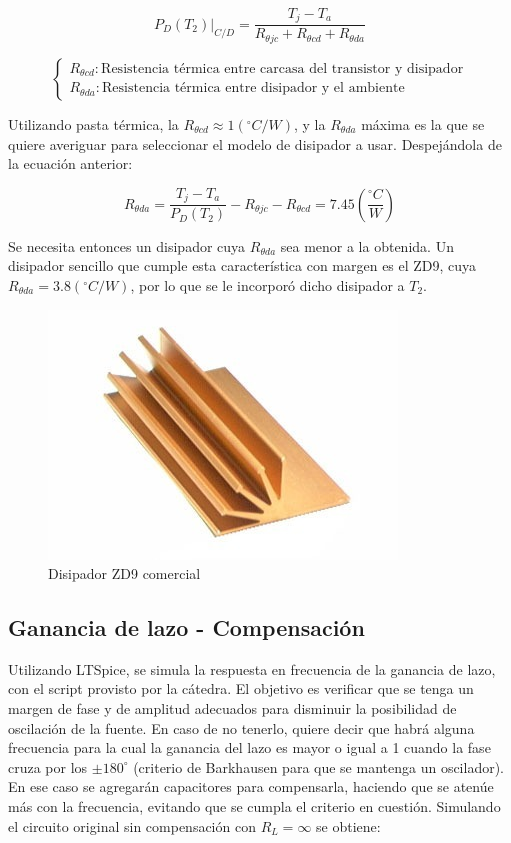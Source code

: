 \[
P_D(T_2) \biggr|_{C/D} = \frac{T_j - T_a}{R_{\theta jc} + R_{\theta cd} + R_{\theta da}}
\]
 
\[
\left\lbrace
\begin{array}{l}
R_{\theta cd}: \textrm{Resistencia t\'ermica entre carcasa del transistor y disipador} \\
R_{\theta da}: \textrm{Resistencia t\'ermica entre disipador y el ambiente}
\end{array}
\right.
\] 

Utilizando pasta t\'ermica, la $R_{\theta cd} \approx 1(^{\circ}C/W)$, y la $R_{\theta da}$ m\'axima es la que se quiere averiguar para seleccionar el modelo de disipador a usar. Despej\'andola de la ecuaci\'on anterior:

\[
R_{\theta da} = \frac{T_j - T_a}{P_D(T_2)} - R_{\theta jc} - R_{\theta cd} = 7.45 \left(\frac{^{\circ}C}{W}\right)
\]
 
Se necesita entonces un disipador cuya $R_{\theta da}$ sea menor a la obtenida. Un disipador sencillo que cumple esta caracter\'istica con margen es el ZD9, cuya $R_{\theta da} = 3.8(^{\circ}C/W)$, por lo que se le incorpor\'o dicho disipador a $T_2$. 
 
\begin{figure}[!h]
\begin{centering}
\includegraphics[scale=0.7]{Imagenes/ZD9.jpg}
\par\end{centering}
\caption{Disipador ZD9 comercial}

\end{figure}
 
\subsection{Ganancia de lazo - Compensaci\'on}

Utilizando LTSpice, se simula la respuesta en frecuencia de la ganancia de lazo, con el script provisto por la c\'atedra. El objetivo es verificar que se tenga un margen de fase y de amplitud adecuados para disminuir la posibilidad de oscilaci\'on de la fuente. En caso de no tenerlo, quiere decir que habr\'a alguna frecuencia para la cual la ganancia del lazo es mayor o igual a 1 cuando la fase cruza por los $\pm 180^{\circ}$ (criterio de Barkhausen para que se mantenga un oscilador). En ese caso se agregar\'an capacitores para compensarla, haciendo que se aten\'ue m\'as con la frecuencia, evitando que se cumpla el criterio en cuesti\'on.
Simulando el circuito original sin compensaci\'on con $R_L = \infty$ se obtiene:

